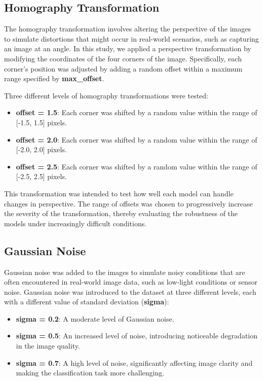 \documentclass{article}
\begin{document}
\subsection{Homography Transformation}
The homography transformation involves altering the perspective of the images to simulate distortions that might occur in real-world scenarios, such as capturing an image at an angle. In this study, we applied a perspective transformation by modifying the coordinates of the four corners of the image. Specifically, each corner's position was adjusted by adding a random offset within a maximum range specified by \textbf{max\_offset}. 

Three different levels of homography transformations were tested:
\begin{itemize}
    \item \textbf{offset = 1.5}: Each corner was shifted by a random value within the range of [-1.5, 1.5] pixels.
    \item \textbf{offset = 2.0}: Each corner was shifted by a random value within the range of [-2.0, 2.0] pixels.
    \item \textbf{offset = 2.5}: Each corner was shifted by a random value within the range of [-2.5, 2.5] pixels.
\end{itemize}

This transformation was intended to test how well each model can handle changes in perspective. The range of offsets was chosen to progressively increase the severity of the transformation, thereby evaluating the robustness of the models under increasingly difficult conditions.

\subsection{Gaussian Noise}
Gaussian noise was added to the images to simulate noisy conditions that are often encountered in real-world image data, such as low-light conditions or sensor noise. Gaussian noise was introduced to the dataset at three different levels, each with a different value of standard deviation (\textbf{sigma}):

\begin{itemize}
    \item \textbf{sigma = 0.2}: A moderate level of Gaussian noise.
    \item \textbf{sigma = 0.5}: An increased level of noise, introducing noticeable degradation in the image quality.
    \item \textbf{sigma = 0.7}: A high level of noise, significantly affecting image clarity and making the classification task more challenging.
\end{itemize}
\end{document}
